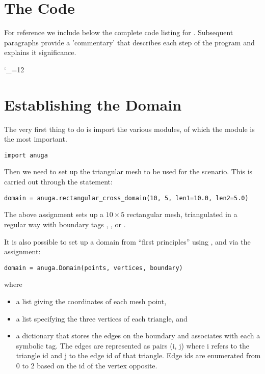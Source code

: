 \documentclass{manual}
\newcommand{\verbatiminputB}[1]{%
\endgroup}
\def\verbatiminputunderscore{\begingroup
\catcode`\_=12
\verbatiminputB}
\begin{document}
\section{The Code}

For reference we include below the complete code listing for
. Subsequent paragraphs provide a
'commentary' that describes each step of the program and explains it
significance.

\label{ref:runup_py_code}
\verbatiminputunderscore{../../anuga_core/examples/runup.py}


\section{Establishing the Domain}

The very first thing to do is import the various modules, of which the
\anuga{} module is the most important.
%
\begin{verbatim}
import anuga
\end{verbatim}
%
Then we need to set up the triangular mesh to be used for the
scenario. This is carried out through the statement:

\begin{verbatim}
domain = anuga.rectangular_cross_domain(10, 5, len1=10.0, len2=5.0)
\end{verbatim}
%
The above assignment sets up a $10 \times
5$ rectangular mesh, triangulated in a regular way with boundary tags , ,
          or .

It is also possible to set up a domain from ``first principles'' using ,  and  via the assignment:
\begin{verbatim}
domain = anuga.Domain(points, vertices, boundary)
\end{verbatim}
where
\begin{itemize}
   \item a list  giving the coordinates of each mesh point,
   \item a list  specifying the three vertices of each triangle, and
   \item a dictionary  that stores the edges on
         the boundary and associates with each a symbolic tag.
         The edges are represented as pairs (i, j) where i refers
         to the triangle id and j to the edge id of that triangle.
         Edge ids are enumerated from 0 to 2 based on the id of the vertex opposite.
\end{itemize}
\end{document}
